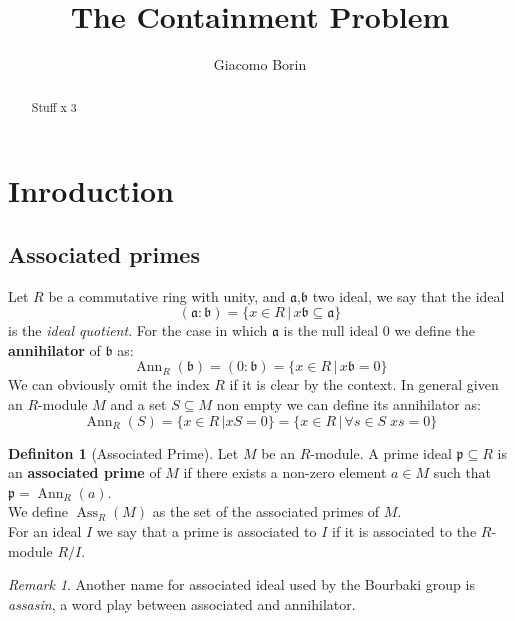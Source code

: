 \documentclass[]{article}
\title{The Containment Problem}
\author{Giacomo Borin}
\theoremstyle{plain}
\theoremstyle{remark}
\newtheorem{rem}{Remark}
\theoremstyle{definition}
\newtheorem{deff}[teo]{Definiton}
\newcommand{\p}{\mathfrak{p}}
\newcommand{\A}{\mathfrak{a}}
\newcommand{\B}{\mathfrak{b}}
\DeclareMathOperator{\Ann}{Ann}
\DeclareMathOperator{\Ass}{Ass}
\begin{document}
\maketitle

\begin{abstract}
	Stuff x 3
\end{abstract}

\section{Inroduction}


\subsection{Associated primes}

Let $ R $ be a commutative ring with unity, and $ \A $,$ \B $ two ideal, we say that the ideal
\begin{equation*}
	(\A : \B) = \{ x \in R \,|\, x\B \subseteq \A  \}
\end{equation*}
 \nocite{AMCD}
is the \textit{ideal quotient}. For the case in which $ \A $  is the null ideal $ 0 $ we define the \textbf{annihilator} of $ \B $ as:
\begin{equation*}
	\Ann_R(\B) = (0 : \B) = \{ x \in R \,|\, x\B = 0  \}
\end{equation*}
We can obviously omit the index $ R $ if it is clear by the context. In general given an $ R  $-module $ M $ and a set $ S \subseteq M $ non empty we can define its annihilator as:
\begin{equation*}
	\Ann_R (S) = \{ x \in R \,| xS = 0  \} = \{ x \in R \,|\, \forall s \in S \; xs = 0  \}
\end{equation*}

\begin{deff}[Associated Prime]
Let $ M $ be an $ R $-module. A prime ideal $ \p \subseteq R $ is an \textbf{associated prime} of $ M $ if there exists a non-zero element $ a \in M $ such that $ \p = \Ann_R (a)$. \\
We define $ \Ass_R(M) $ as the set of the associated primes of $ M $.\\
For an ideal $ I $ we say that a prime is associated to $ I $ if it is associated to the $ R $-module $ R/I $.
\end{deff}

\begin{rem}
	Another name for associated ideal used by the Bourbaki group is \textit{assasin}, a word play between associated and annihilator. %
\end{rem}
\end{document}
